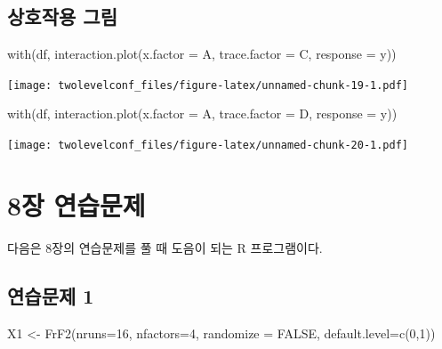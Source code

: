 \documentclass[
]{book}
\newenvironment{Shaded}{\begin{snugshade}}{\end{snugshade}}
\newcommand{\AttributeTok}[1]{\textcolor[rgb]{0.77,0.63,0.00}{#1}}
\newcommand{\ConstantTok}[1]{\textcolor[rgb]{0.00,0.00,0.00}{#1}}
\newcommand{\DecValTok}[1]{\textcolor[rgb]{0.00,0.00,0.81}{#1}}
\newcommand{\FunctionTok}[1]{\textcolor[rgb]{0.00,0.00,0.00}{#1}}
\newcommand{\NormalTok}[1]{#1}
\newcommand{\OtherTok}[1]{\textcolor[rgb]{0.56,0.35,0.01}{#1}}
\begin{document}
\hypertarget{uxc0c1uxd638uxc791uxc6a9-uxadf8uxb9bc}{%
\section{상호작용 그림}\label{uxc0c1uxd638uxc791uxc6a9-uxadf8uxb9bc}}

\begin{Shaded}
\begin{Highlighting}[]
\FunctionTok{with}\NormalTok{(df, }\FunctionTok{interaction.plot}\NormalTok{(}\AttributeTok{x.factor =}\NormalTok{ A, }\AttributeTok{trace.factor =}\NormalTok{ C,  }\AttributeTok{response =}\NormalTok{ y))}
\end{Highlighting}
\end{Shaded}

\texttt{[image: twolevelconf\_files/figure-latex/unnamed-chunk-19-1.pdf]}

\begin{Shaded}
\begin{Highlighting}[]
\FunctionTok{with}\NormalTok{(df, }\FunctionTok{interaction.plot}\NormalTok{(}\AttributeTok{x.factor =}\NormalTok{ A, }\AttributeTok{trace.factor =}\NormalTok{ D,  }\AttributeTok{response =}\NormalTok{ y))}
\end{Highlighting}
\end{Shaded}

\texttt{[image: twolevelconf\_files/figure-latex/unnamed-chunk-20-1.pdf]}

\hypertarget{exerxise8}{%
\chapter{8장 연습문제}\label{exerxise8}}

다음은 8장의 연습문제를 풀 때 도음이 되는 R 프로그램이다.

\hypertarget{uxc5f0uxc2b5uxbb38uxc81c-1}{%
\section{연습문제 1}\label{uxc5f0uxc2b5uxbb38uxc81c-1}}

\begin{Shaded}
\begin{Highlighting}[]
\NormalTok{X1 }\OtherTok{\textless{}{-}} \FunctionTok{FrF2}\NormalTok{(}\AttributeTok{nruns=}\DecValTok{16}\NormalTok{, }\AttributeTok{nfactors=}\DecValTok{4}\NormalTok{, }\AttributeTok{randomize =} \ConstantTok{FALSE}\NormalTok{,  }\AttributeTok{default.level=}\FunctionTok{c}\NormalTok{(}\DecValTok{0}\NormalTok{,}\DecValTok{1}\NormalTok{))}
\end{Highlighting}
\end{Shaded}
\end{document}
